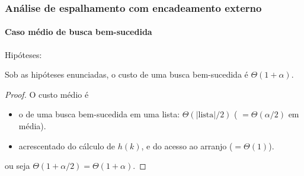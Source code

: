 \documentclass{beamer}
\begin{document}
\begin{frame}

  \frametitle{Análise de espalhamento com encadeamento externo}
  \framesubtitle{Caso médio de busca bem-sucedida}

  Hipóteses:

  \begin{theorem}

    Sob as hipóteses enunciadas, o custo de uma busca bem-sucedida é $\Theta(1+\alpha)$.

  \end{theorem}

  \pause

  \begin{proof}

  O custo médio é
  \begin{itemize}

    \item o de uma busca bem-sucedida em uma lista: $\Theta(| \text{lista} | /2)$ ( $= \Theta( \alpha / 2)$ em média).

    \item acrescentado do cálculo de $h(k)$, e do acesso ao arranjo ($= \Theta(1)$).

  \end{itemize}
  ou seja $\Theta(1 + \alpha/2) = \Theta(1 + \alpha)$.

  \end{proof}
\end{frame}
\end{document}
